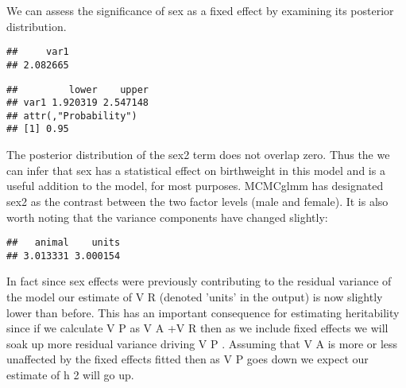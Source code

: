 \documentclass[12pt,]{book}
\newenvironment{Shaded}{\begin{snugshade}}{\end{snugshade}}
\newcommand{\FloatTok}[1]{\textcolor[rgb]{0.00,0.00,0.81}{#1}}
\newcommand{\KeywordTok}[1]{\textcolor[rgb]{0.13,0.29,0.53}{\textbf{#1}}}
\newcommand{\NormalTok}[1]{#1}
\newcommand{\OperatorTok}[1]{\textcolor[rgb]{0.81,0.36,0.00}{\textbf{#1}}}
\newcommand{\StringTok}[1]{\textcolor[rgb]{0.31,0.60,0.02}{#1}}
\begin{document}
We can assess the significance of sex as a fixed effect by examining its posterior distribution.

\begin{Shaded}
\end{Shaded}

\begin{verbatim}
##     var1 
## 2.082665
\end{verbatim}

\begin{Shaded}
\end{Shaded}

\begin{verbatim}
##         lower    upper
## var1 1.920319 2.547148
## attr(,"Probability")
## [1] 0.95
\end{verbatim}

The posterior distribution of the sex2 term does not overlap zero. Thus the we can infer that sex has a statistical effect on birthweight in this model and is a useful addition to the model, for most purposes. MCMCglmm has designated sex2 as the contrast between the two factor levels (male and female). It is also worth noting that the variance components have changed slightly:

\begin{Shaded}
\end{Shaded}

\begin{verbatim}
##   animal    units 
## 3.013331 3.000154
\end{verbatim}

In fact since sex effects were previously contributing to the residual variance of the model our estimate of V R (denoted 'units' in the output) is now slightly lower than before. This has an important consequence for estimating heritability since if we calculate V P as V A +V R then as we include fixed effects we will soak up more residual variance driving V P . Assuming that V A is more or less unaffected by the fixed effects fitted then as V P goes down we expect our estimate of h 2 will go up.
\end{document}

